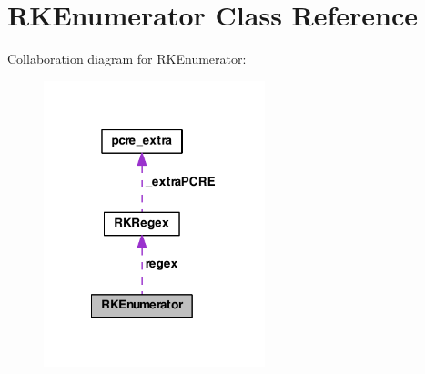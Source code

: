 \hypertarget{interface_r_k_enumerator}{\section{R\-K\-Enumerator Class Reference}
\label{interface_r_k_enumerator}
}


Collaboration diagram for R\-K\-Enumerator\-:
\nopagebreak
\begin{figure}[H]
\begin{center}
\leavevmode
\includegraphics[width=182pt]{interface_r_k_enumerator__coll__graph}
\end{center}
\end{figure}
